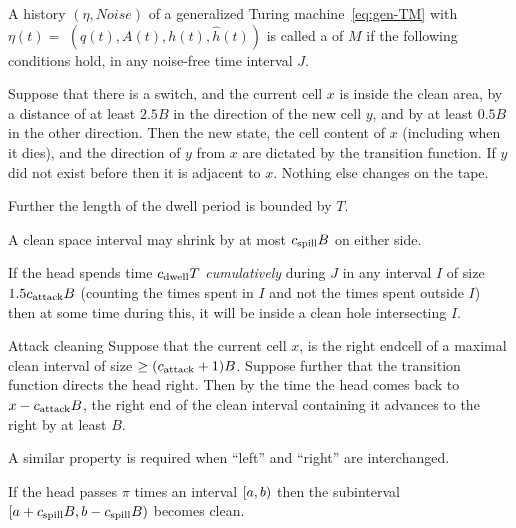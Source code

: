 \documentclass[12pt]{memoir}
\renewcommand{\ge}{\geq}
\def\B{B}
\newcommand{\h}{h}
\newcommand{\hc}{\hat h}
\newcommand{\Noise}{\mathit{Noise}}
\newcommand{\Tu}{T}
\newcommand{\CDwell}{\cns{dwell}}
\newcommand{\cns}[1]{c_{\textrm{\upshape #1}}}
\newcommand{\CAtt}{\cns{attack}}
\newcommand{\CSpill}{\cns{spill}}
\begin{document}
\begin{definition}[Trajectory]\label{def:traj}
\begin{sloppypar}
   A history  \( (\eta, \Noise) \) of a generalized Turing 
machine~\eqref{eq:gen-TM} with \(\eta(t) =\)
\( (q(t), A(t), \h(t), \hc(t)) \)
is called a  of \( M \) if the following conditions hold, in any 
noise-free time interval \( J \).
  \end{sloppypar}
\begin{description}

\item[Transition Function]\label{i:def.traj.transition}
Suppose that there is a switch, and the current cell \( x \)
is inside the clean area, by a distance of at least \( 2.5\B \) in the direction of the
new cell \( y \), and by at least \( 0.5\B \) in the other direction.
Then the new state, the cell content of \( x \) (including when it dies), and
the direction of \( y \) from \( x \) are dictated by the transition function.
If \( y \) did not exist before then it is adjacent to \( x \).
Nothing else changes on the tape.

Further the length of the dwell period is bounded by \( \Tu \).

\item[Spill Bound]\label{i:spill-bound}
A clean space interval may shrink by at most \( \CSpill \B \) on either side.

\item[Dwell Cleaning] \label{i:def.traj.dwell-cleaning}
If the head spends time \( \CDwell\Tu \) \emph{cumulatively} during \( J \) in any interval 
\( I \) of size \( 1.5\CAtt B \)  (counting the times spent in \( I \) and 
not the times spent outside \( I \)) then at some time during this, it will be 
inside a clean hole intersecting \( I \).

\begin{sloppypar}
\item[Attack cleaning] \label{i:def.traj.attack-cleaning}
Suppose that the current cell \( x \), is the right endcell of a maximal clean interval of size
\( \ge (\CAtt+1)\B \).
Suppose further that the transition function directs the head right.
Then by the time the head comes back to \( x-\CAtt \B \), the right end of the clean interval containing it
advances to the right by at least \( \B \).
 \end{sloppypar}

A similar property is required when ``left'' and ``right'' are interchanged.

\item[Pass Cleaning]\label{i:def.traj.pass-cleaning}
If the head passes  \( \pi \) times  an interval \( \left[a,b\right) \) then
the subinterval \( \lint{a+\CSpill B}{b-\CSpill B} \) becomes clean.

\end{description}

\end{definition}
\end{document}
